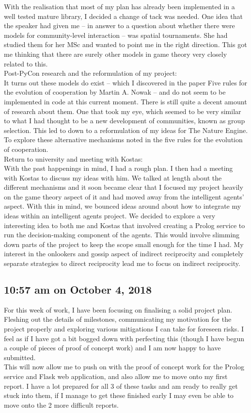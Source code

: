 \documentclass[]{final_report}
\begin{document}
With the realisation that most of my plan has already been implemented in a well tested mature library, I decided a change of tack was needed. One idea that the speaker had given me – in answer to a question about whether there were models for community-level interaction – was spatial tournaments. She had studied them for her MSc and wanted to point me in the right direction. This got me thinking that there are surely other models in game theory very closely related to this. \\
Post-PyCon research and the reformulation of my project:\\
It turns out these models do exist – which I discovered in the paper Five rules for the evolution of cooperation by Martin A. Nowak – and do not seem to be implemented in code at this current moment. There is still quite a decent amount of research about them. One that took my eye, which seemed to be very similar to what I had thought to be a new development of communities, known as group selection. This led to down to a reformulation of my ideas for The Nature Engine. To explore these alternative mechanisms noted in the five rules for the evolution of cooperation.\\
Return to university and meeting with Kostas:\\
With the past happenings in mind, I had a rough plan. I then had a meeting with Kostas to discuss my ideas with him. We talked at length about the different mechanisms and it soon became clear that I focused my project heavily on the game theory aspect of it and had moved away from the intelligent agents’ aspect. With this in mind, we bounced ideas around about how to integrate my ideas within an intelligent agents project. We decided to explore a very interesting idea to both me and Kostas that involved creating a Prolog service to run the decision-making component of the agents. This would involve slimming down parts of the project to keep the scope small enough for the time I had. My interest in the onlookers and gossip aspect of indirect reciprocity and completely separate strategies to direct reciprocity lead me to focus on indirect reciprocity.

\subsection*{10:57 am on October 4, 2018}
For this week of work, I have been focusing on finalising a solid project plan. Fleshing out the details of milestones, communicating my motivation for the project properly and exploring various mitigations I can take for foreseen risks. I feel as if I have got a bit bogged down with perfecting this (though I have begun a couple of pieces of proof of concept work) and I am now happy to have submitted.\\
This will now allow me to push on with the proof of concept work for the Prolog service and Flask web application, and also allow me to move onto my first report. I have a lot prepared for all 3 of these tasks and am ready to really get stuck into them, if I manage to get these finished early I may even be able to move onto the 2 more difficult reports.
\end{document}
